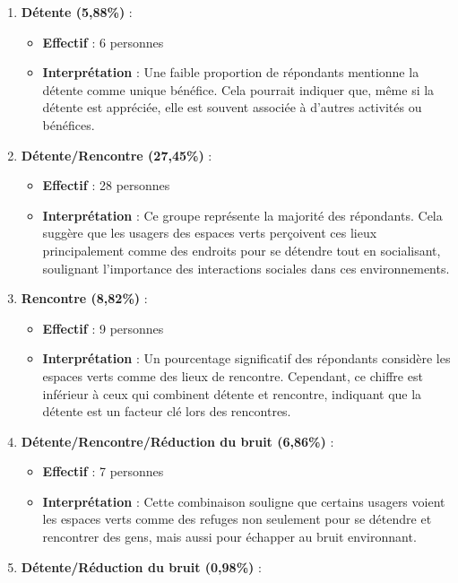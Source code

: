 \documentclass[
]{article}
\providecommand{\tightlist}{%
  \setlength{\itemsep}{0pt}\setlength{\parskip}{0pt}}
\begin{document}
\begin{enumerate}
\def\labelenumi{\arabic{enumi}.}
\tightlist
\item
  \textbf{Détente (5,88\%)} :

  \begin{itemize}
  \tightlist
  \item
    \textbf{Effectif} : 6 personnes
  \item
    \textbf{Interprétation} : Une faible proportion de répondants
    mentionne la détente comme unique bénéfice. Cela pourrait indiquer
    que, même si la détente est appréciée, elle est souvent associée à
    d'autres activités ou bénéfices.
  \end{itemize}
\item
  \textbf{Détente/Rencontre (27,45\%)} :

  \begin{itemize}
  \tightlist
  \item
    \textbf{Effectif} : 28 personnes
  \item
    \textbf{Interprétation} : Ce groupe représente la majorité des
    répondants. Cela suggère que les usagers des espaces verts
    perçoivent ces lieux principalement comme des endroits pour se
    détendre tout en socialisant, soulignant l'importance des
    interactions sociales dans ces environnements.
  \end{itemize}
\item
  \textbf{Rencontre (8,82\%)} :

  \begin{itemize}
  \tightlist
  \item
    \textbf{Effectif} : 9 personnes
  \item
    \textbf{Interprétation} : Un pourcentage significatif des répondants
    considère les espaces verts comme des lieux de rencontre. Cependant,
    ce chiffre est inférieur à ceux qui combinent détente et rencontre,
    indiquant que la détente est un facteur clé lors des rencontres.
  \end{itemize}
\item
  \textbf{Détente/Rencontre/Réduction du bruit (6,86\%)} :

  \begin{itemize}
  \tightlist
  \item
    \textbf{Effectif} : 7 personnes
  \item
    \textbf{Interprétation} : Cette combinaison souligne que certains
    usagers voient les espaces verts comme des refuges non seulement
    pour se détendre et rencontrer des gens, mais aussi pour échapper au
    bruit environnant.
  \end{itemize}
\item
  \textbf{Détente/Réduction du bruit (0,98\%)} :


\end{enumerate}
\end{document}
